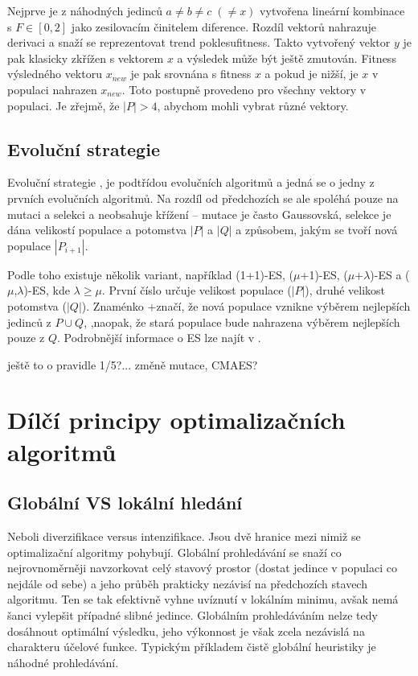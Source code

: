 Nejprve je z náhodných jedinců $a \ne b \ne c \; (\ne x)$ vytvořena lineární kombinace s $F \in [0,2]$ jako zesilovacím činitelem diference. Rozdíl vektorů nahrazuje derivaci a snaží se reprezentovat \bq trend poklesu\eq  fitness. Takto vytvořený vektor $y$ je pak klasicky zkřížen s vektorem $x$ a výsledek může být ještě zmutován. Fitness výsledného vektoru $x_{new}$ je pak srovnána s fitness $x$ a pokud je nižší, je $x$ v populaci nahrazen $x_{new}$. Toto postupně provedeno pro všechny vektory v populaci. Je zřejmě, že $|P| > 4$, abychom mohli vybrat různé vektory.

\subsection{Evoluční strategie}

Evoluční strategie \cite{ES comprehensive},\cite{GO ebook} je podtřídou evolučních algoritmů a jedná se o jedny z prvních evolučních algoritmů. Na rozdíl od předchozích se ale spoléhá pouze na mutaci a selekci a neobsahuje křížení -- mutace je často Gaussovská, selekce je dána velikostí populace a potomstva $|P|$ a $|Q|$ a způsobem, jakým se tvoří nová populace $|P_{i+1}|$.

Podle toho existuje několik variant, například (1+1)-ES, ($\mu$+1)-ES, ($\mu$+$\lambda$)-ES a ($\mu$,$\lambda$)-ES, kde $\lambda \geq \mu$. První číslo určuje velikost populace ($|P|$), druhé velikost potomstva ($|Q|$). Znaménko \bq +\eq  značí, že nová populace vznikne výběrem nejlepších jedinců z $P\cup Q$, \bq ,\eq  naopak, že stará populace bude nahrazena výběrem nejlepších pouze z $Q$. Podrobnější informace o ES lze najít v \cite{ES comprehensive}.

ještě to o pravidle 1/5?... změně mutace, CMAES?

\section{Dílčí principy optimalizačních algoritmů}\label{myslenky GO}

\subsection{Globální VS lokální hledání}

Neboli diverzifikace versus intenzifikace. Jsou dvě hranice mezi nimiž se optimalizační algoritmy pohybují. Globální prohledávání se snaží co nejrovnoměrněji navzorkovat celý stavový prostor (dostat jedince v populaci co nejdále od sebe) a jeho průběh prakticky nezávisí na předchozích stavech algoritmu. Ten se tak efektivně vyhne uvíznutí v lokálním minimu, avšak nemá šanci vylepšit případné slibné jedince. Globálním prohledáváním nelze tedy dosáhnout optimální výsledku, jeho výkonnost je však zcela nezávislá na charakteru účelové funkce. Typickým příkladem čistě globální heuristiky je náhodné prohledávání.

